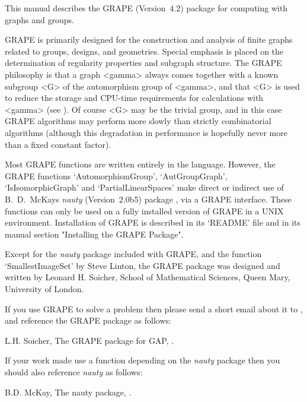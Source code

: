 %
%
%
%
\def\GRAPE{\sf GRAPE}
\def\nauty{\it nauty}
\def\Aut{{\rm Aut}\,} 


This manual describes the {\GRAPE} (Version~4.2) package for computing
with graphs and groups.

{\GRAPE} is primarily designed for the construction and analysis of
finite graphs related to groups, designs, and geometries. Special
emphasis is placed on the determination of regularity properties and
subgraph structure. The {\GRAPE} philosophy is that a graph <gamma>
always comes together with a known subgroup <G> of the automorphism
group of <gamma>, and that <G> is used to reduce the storage and
CPU-time requirements for calculations with <gamma> (see
\cite{Soi93}).  Of course <G> may be the trivial group, and in this
case {\GRAPE} algorithms may perform more slowly than strictly
combinatorial algorithms (although this degradation in performance is
hopefully never more than a fixed constant factor).

Most {\GRAPE} functions are written entirely in the {\GAP} language.
However, the {\GRAPE} functions `AutomorphismGroup', `AutGroupGraph',
`IsIsomorphicGraph' and `PartialLinearSpaces' make direct or indirect
use of B.~D.~McKay{\pif}s {\nauty} (Version~2.0b5) package \cite{Nau90},
via a {\GRAPE} interface.  These functions can only be used on a fully
installed version of {\GRAPE} in a UNIX environment.  Installation of
{\GRAPE} is described in its `README' file and in its manual section
"Installing the GRAPE Package".

Except for the {\nauty} package included with {\GRAPE}, and the function
`SmallestImageSet' by Steve Linton, the {\GRAPE} package was designed
and written by Leonard H. Soicher, School of Mathematical Sciences,
Queen Mary, University of London.

If you use {\GRAPE} to solve a problem then please send a short email
about it to , and reference the {\GRAPE} 
package as follows:

L.H. Soicher, The {GRAPE} package for {GAP},
.

If your work made use a function depending on the {\nauty} package then
you should also reference {\nauty} as follows:

B.D. McKay, The {nauty} package,
.

